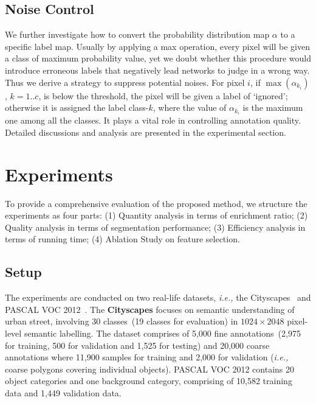 \documentclass[sigconf]{acmart}
\newcommand{\eat}[1]{}
\begin{document}
\subsection{Noise Control}
We further investigate how to convert the probability distribution map $\alpha$ to a specific label map. Usually by applying a max operation, every pixel will be given a class of maximum probability value, yet we doubt whether this procedure would introduce erroneous labels that negatively lead networks to judge in a wrong way. Thus we derive a strategy to suppress potential noises. For pixel $i$, if $\max(\alpha_{k_i})$, $k=1..c$, is below the threshold, the pixel will be given a label of `ignored'; otherwise it is assigned the label class-$k$, where the value of $\alpha_{k_i}$ is the maximum one among all the classes. It plays a vital role in controlling annotation quality. Detailed discussions and analysis are presented in the experimental section.

\section{Experiments}

To provide a comprehensive evaluation of the proposed method, we structure the experiments as four parts: (1) Quantity analysis in terms of enrichment ratio; (2) Quality analysis in terms of segmentation performance; (3) Efficiency analysis in terms of running time; (4) Ablation Study on feature selection.
\eat{
	Comparison with other annotation refinement methods~(dense-CRF) in terms of enrichment scale (2) Comparison with weakly supervised segmentation models. }

\subsection{Setup}
The experiments are conducted on two real-life datasets, \textit{i.e.,} the Cityscapes~\cite{cityscapes} and PASCAL VOC 2012~\cite{pascalvoc}. The \textbf{Cityscapes} focuses on semantic understanding of urban street, involving 30 classes~(19 classes for evaluation) in $1024\times 2048$ pixel-level semantic labelling. The dataset comprises of 5,000 fine annotations~(2,975 for training, 500 for validation and 1,525 for testing) and 20,000 coarse annotations where 11,900 samples for training and 2,000 for validation (\textit{i.e.,} coarse polygons covering individual objects).  PASCAL VOC 2012 contains 20 object categories and one background category, comprising of 10,582 training data and 1,449 validation data.
\end{document}
